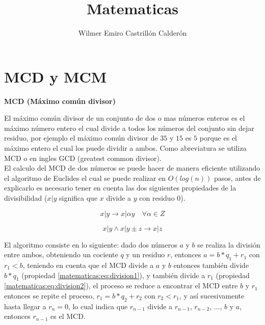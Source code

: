 \documentclass[12pt, a4paper]{article}
\title{\textbf{Matematicas}}
\author{Wilmer Emiro Castrillón Calderón}
\newcommand{\subtitulo}[1]{\begin{center}\textbf{#1}\end{center}}
\begin{document}
	\maketitle
	
	
	\section{MCD y MCM}
	\label{matematicas:mcd_y_mcm}
	
	\subtitulo{MCD (Máximo común divisor)}
	
	El máximo común divisor de un conjunto de dos o mas números enteros es el máximo número entero el cual divide a  
	todos los números del conjunto sin dejar residuo, por ejemplo el máximo común divisor de $35$ y $15$ es $5$ porque  
	es el máximo entero el cual los puede dividir a ambos. Como abreviatura se utiliza MCD o en ingles GCD (greatest  
	common divisor).\\
	
	El calculo del MCD de dos números se puede hacer de manera eficiente utilizando el algoritmo de Euclides el cual
	se puede realizar en $O(log(n))$ pasos, antes de explicarlo es necesario tener en cuenta las dos siguientes 
	propiedades de la divisibilidad ($x|y$ significa que $x$ divide a $y$ con residuo $0$).
	
	\begin{equation}
		\label{matematicas:eq:division1}
		x|y \rightarrow x| \alpha y \quad \forall \alpha \in Z
	\end{equation}
	
	\begin{equation}
		\label{matematicas:eq:division2}
		x|y \wedge x|y \pm z \rightarrow x|z
	\end{equation}
	
	El algoritmo consiste en lo siguiente: dado dos números $a$ y $b$ se realiza la división entre ambos, obteniendo un
	cociente $q$ y un residuo $r$, entonces $a = b*q_{1} + r_{1}$ con $r_{1} < b$, teniendo en cuenta que el MCD divide 
	a $a$ y $b$ entonces también divide $b*q_{1}$ (propiedad \ref{matematicas:eq:division1}), y también divide a 
	$r_1$ (propiedad \ref{matematicas:eq:division2}), el proceso se reduce a encontrar el MCD entre $b$ y $r_{1}$ 
	entonces se repite el proceso, $r_{1} = b*q_{2} + r_{2}$ con $r_{2} < r_{1}$, y así sucesivamente hasta llegar a 
	$r_{n} = 0$, lo cual indica que $r_{n-1}$ divide a $r_{n-1}$, $r_{n-2}$, ..., $b$ y $a$, entonces $r_{n-1}$ es el 
	MCD.
	
\end{document}

